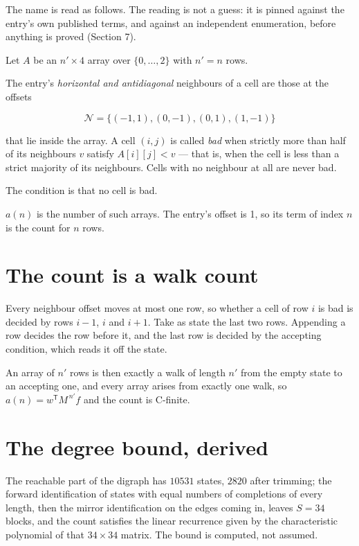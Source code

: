 \documentclass[11pt]{article}
\theoremstyle{definition}
\begin{document}
The name is read as follows. The reading is not a guess: it is pinned against the entry's own published terms, and against an independent enumeration, before anything is proved (Section 7).

Let $A$ be an $n' \times 4$ array over $\{0,\dots,2\}$ with $n' = n$ rows.

The entry's {\itshape horizontal and antidiagonal} neighbours of a cell are those at the offsets

\[\mathcal{N} = \{(-1,1), (0,-1), (0,1), (1,-1)\}\]

that lie inside the array. A cell $(i,j)$ is called {\itshape bad} when strictly more than half of its neighbours $v$ satisfy $A[i][j] < v$ --- that is, when the cell is less than a strict majority of its neighbours. Cells with no neighbour at all are never bad.

The condition is that no cell is bad.

$a(n)$ is the number of such arrays. The entry's offset is 1, so its term of index $n$ is the count for $n$ rows.

\section{The count is a walk count}

Every neighbour offset moves at most one row, so whether a cell of row $i$ is bad is decided by rows $i-1$, $i$ and $i+1$. Take as state the last two rows. Appending a row decides the row before it, and the last row is decided by the accepting condition, which reads it off the state.

An array of $n'$ rows is then exactly a walk of length $n'$ from the empty state to an accepting one, and every array arises from exactly one walk, so $a(n) = w^{\mathsf T}M^{\,n'}f$ and the count is C-finite.

\section{The degree bound, derived}

The reachable part of the digraph has $10531$ states, $2820$ after trimming; the forward identification of states with equal numbers of completions of every length, then the mirror identification on the edges coming in, leaves $S = 34$ blocks, and the count satisfies the linear recurrence given by the characteristic polynomial of that $34\times34$ matrix. The bound is computed, not assumed.
\end{document}
